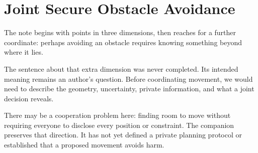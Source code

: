 \chapter{Joint Secure Obstacle Avoidance}
\label{short:obstacle-avoidance}

The note begins with points in three dimensions, then reaches for a further
coordinate: perhaps avoiding an obstacle requires knowing something beyond
where it lies.

The sentence about that extra dimension was never completed. Its intended
meaning remains an author's question. Before coordinating movement, we would
need to describe the geometry, uncertainty, private information, and what a
joint decision reveals.

There may be a cooperation problem here: finding room to move without
requiring everyone to disclose every position or constraint. The companion
preserves that direction. It has not yet defined a private planning protocol
or established that a proposed movement avoids harm.

